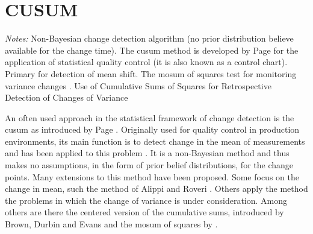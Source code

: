 \section{CUSUM}\label{cusum}




\emph{Notes:}
Non-Bayesian change detection algorithm (\ie no prior distribution believe available for the change time).
The \gls{cusum} method is developed by Page \cite{page1954continuous} for the application of statistical quality control (it is also known as a control chart).
Primary for detection of mean shift.
The \gls{mosum} of squares test for monitoring variance changes \cite{hsu2007mosum}.
Use of Cumulative Sums of Squares for Retrospective Detection of Changes of Variance \cite{inclan1994use}

An often used approach in the statistical framework of change detection is the \gls{cusum} as introduced by Page \cite{page1954continuous}.
Originally used for quality control in production environments, its main function is to detect change in the mean of measurements and has been applied to this problem \cite{basseville1993detection}.
It is a non-Bayesian method and thus makes no assumptions, in the form of prior belief distributions, for the change points.
Many extensions to this method have been proposed.
Some focus on the change in mean, such the method of Alippi and Roveri \cite{alippi2006adaptive}.
Others apply the method the problems in which the change of variance is under consideration.
Among others are there the centered version of the cumulative sums, introduced by Brown, Durbin and Evans \cite{brown1975techniques} and the \gls{mosum} of squares by \cite{hsu2007mosum}.

